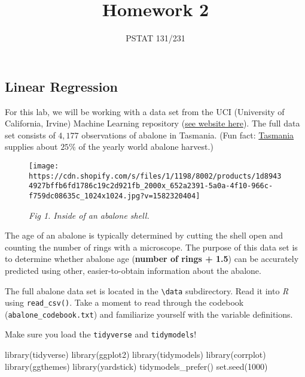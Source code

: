 \documentclass[
]{article}
\title{Homework 2}
\author{PSTAT 131/231}
\date{}
\newenvironment{Shaded}{\begin{snugshade}}{\end{snugshade}}
\newcommand{\DecValTok}[1]{\textcolor[rgb]{0.00,0.00,0.81}{#1}}
\newcommand{\FunctionTok}[1]{\textcolor[rgb]{0.00,0.00,0.00}{#1}}
\newcommand{\NormalTok}[1]{#1}
\begin{document}
\maketitle

{
\setcounter{tocdepth}{2}
\tableofcontents
}
\hypertarget{linear-regression}{%
\subsection{Linear Regression}\label{linear-regression}}

For this lab, we will be working with a data set from the UCI
(University of California, Irvine) Machine Learning repository
(\href{http://archive.ics.uci.edu/ml/datasets/Abalone}{see website
here}). The full data set consists of \(4,177\) observations of abalone
in Tasmania. (Fun fact:
\href{https://en.wikipedia.org/wiki/Tasmania}{Tasmania} supplies about
\(25\%\) of the yearly world abalone harvest.)

\begin{figure}
\centering
\texttt{[image: https://cdn.shopify.com/s/files/1/1198/8002/products/1d89434927bffb6fd1786c19c2d921fb\_2000x\_652a2391-5a0a-4f10-966c-f759dc08635c\_1024x1024.jpg?v=1582320404]}
\caption{\emph{Fig 1. Inside of an abalone shell.}}
\end{figure}

The age of an abalone is typically determined by cutting the shell open
and counting the number of rings with a microscope. The purpose of this
data set is to determine whether abalone age (\textbf{number of rings +
1.5}) can be accurately predicted using other, easier-to-obtain
information about the abalone.

The full abalone data set is located in the
\texttt{\textbackslash{}data} subdirectory. Read it into \emph{R} using
\texttt{read\_csv()}. Take a moment to read through the codebook
(\texttt{abalone\_codebook.txt}) and familiarize yourself with the
variable definitions.

Make sure you load the \texttt{tidyverse} and \texttt{tidymodels}!

\begin{Shaded}
\begin{Highlighting}[]
\FunctionTok{library}\NormalTok{(tidyverse)}
\FunctionTok{library}\NormalTok{(ggplot2)}
\FunctionTok{library}\NormalTok{(tidymodels)}
\FunctionTok{library}\NormalTok{(corrplot)}
\FunctionTok{library}\NormalTok{(ggthemes)}
\FunctionTok{library}\NormalTok{(yardstick)}
\FunctionTok{tidymodels\_prefer}\NormalTok{() }
\FunctionTok{set.seed}\NormalTok{(}\DecValTok{1000}\NormalTok{)}
\end{Highlighting}
\end{Shaded}
\end{document}
